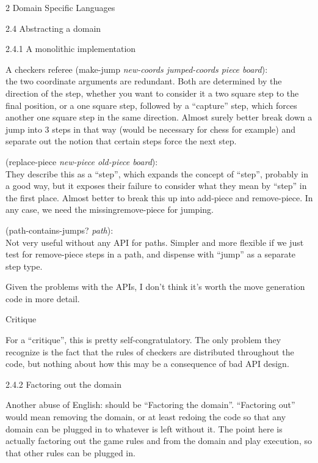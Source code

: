 \documentclass[12pt]{PalisadesLakesBook}
\begin{document}
\begin{plSection}{}
\begin{plSection}{2 Domain Specific Languages}
\begin{plSection}{2.4 Abstracting a domain}
\begin{plSection}{2.4.1 A monolithic implementation}
\begin{plSection}{A checkers referee}
{\schemeFont 
(make-jump {\itshape new-coords jumped-coords piece board})}:\\
the two coordinate arguments are redundant.
Both are determined by the direction of the step,
whether you want to consider it a two square step to the final
position, or a one square step, followed by a ``capture'' step,
which forces another one square step in the same direction.
Almost surely better break down a jump into 3 steps in that way
(would be necessary for chess for example)
and separate out the notion that certain steps 
force the next step.

{\schemeFont (replace-piece {\itshape new-piece old-piece board})}:\\
They describe this as a ``step'', 
which expands the concept of ``step'',
probably in a good way, but it exposes their failure to consider 
what they mean by ``step'' in the first place.
Almost better to break this up into {\schemeFont add-piece}
and {\schemeFont remove-piece}.
In any case, 
we need the missing{\schemeFont remove-piece} for jumping.

{\schemeFont (path-contains-jumps? {\itshape path})}:\\
Not very useful without any API for paths.
Simpler and more flexible if we 
just test for {\schemeFont remove-piece}
steps in a path, and dispense with ``jump''
as a separate step type.

Given the problems with the APIs, I don't think it's worth
the move generation code in more detail.

\end{plSection}%
\begin{plSection}{Critique}

For a ``critique'', this is pretty self-congratulatory.
The only problem they recognize is the fact that the rules
of checkers are distributed throughout the code,
but nothing about how this may be a consequence 
of bad API design.

\end{plSection}%
\end{plSection}%
\begin{plSection}{2.4.2 Factoring out the domain}

Another abuse of English: should be ``Factoring the domain''.
``Factoring out'' would mean removing the domain,
or at least redoing the code so that any domain can be plugged in
to whatever is left without it.
The point here is actually factoring out the game rules and 
from the domain and play execution, so that other rules can
be plugged in.


\end{plSection}
\end{plSection}
\end{plSection}
\end{plSection}
\end{document}
